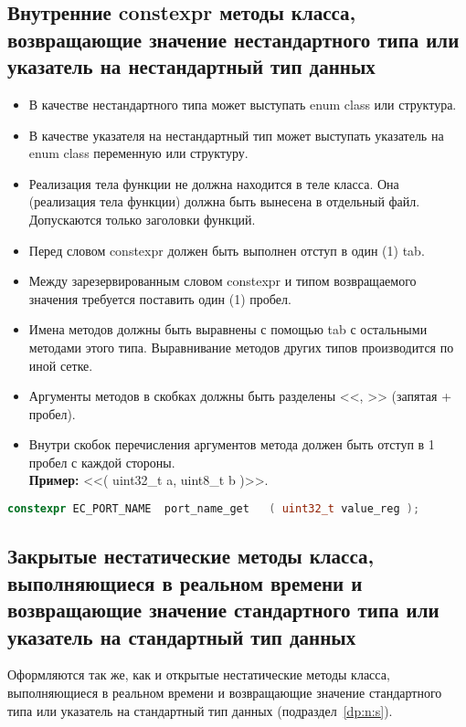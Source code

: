 \subsection{Внутренние constexpr методы класса, возвращающие значение не\-стан\-дарт\-но\-го типа или указатель на не\-стан\-дарт\-ный тип данных}\label{zp:constexpr:n}
\begin{itemize}
	\item В качестве нестандартного типа может выступать enum class или структура.
	\item В качестве указателя на нестандартный тип может выступать указатель на enum class переменную или структуру.
	\item Реализация тела функции не должна находится в теле класса. Она (реализация тела функции) должна быть вынесена в отдельный файл. Допускаются только заголовки функций.
	\item Перед словом constexpr должен быть выполнен отступ в один (1) tab.
	\item Между зарезервированным словом constexpr и типом возвращаемого значения требуется поставить один (1) пробел.
	\item Имена методов должны быть выравнены с помощью tab с остальными методами этого типа. Выравнивание методов других типов производится по иной сетке.
	\item Аргументы методов в скобках должны быть разделены <<, >> (запятая + пробел).
	\item Внутри скобок перечисления аргументов метода должен быть отступ в 1 пробел с каждой стороны.\\\textbf{Пример: } <<( uint32\_t a, uint8\_t b )>>.
\end{itemize}\begin{lstlisting}[language=C++, frame=tlBR, basicstyle=\fontsize{10}{10}\ttfamily]
	constexpr EC_PORT_NAME	port_name_get	( uint32_t value_reg );
\end{lstlisting}

\subsection{Закрытые нестатические методы класса, выполняющиеся в реальном времени и возвращающие значение стандартного типа или указатель на стандартный тип данных}\label{zp:n:s}
Оформляются так же, как и открытые нестатические методы класса, выполняющиеся в реальном времени и возвращающие значение стандартного типа или указатель на стандартный тип данных (подраздел~\ref{dp:n:s}).

